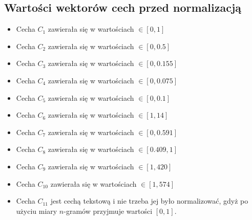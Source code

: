 \documentclass{classrep}
\begin{document}
\subsection{Wartości wektorów cech przed normalizacją}
\begin{itemize}
	\item Cecha $C_{1}$ zawierała się w wartościach $\in [0,1]$
	\item Cecha $C_{2}$ zawierała się w wartościach $\in [0,0.5]$
	\item Cecha $C_{3}$ zawierała się w wartościach $\in [0,0.155]$
	\item Cecha $C_{4}$ zawierała się w wartościach $\in [0,0.075]$
	\item Cecha $C_{5}$ zawierała się w wartościach $\in [0,0.1]$
	\item Cecha $C_{6}$ zawierała się w wartościach $\in [1,14]$
	\item Cecha $C_{7}$ zawierała się w wartościach $\in [0,0.591]$
	\item Cecha $C_{8}$ zawierała się w wartościach $\in [0.409,1]$
	\item Cecha $C_{9}$ zawierała się w wartościach $\in [1,420]$
	\item Cecha $C_{10}$ zawierała się w wartościach $\in [1,574]$
	\item Cecha $C_{11}$ jest cechą tekstową i nie trzeba jej było normalizować, gdyż po użyciu miary $n$-gramów przyjmuje wartości $[0,1]$.
\end{itemize}


\newpage
\end{document}
